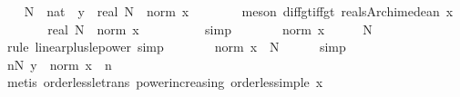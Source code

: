 \begin{isabellebody}
\ \ \isamarkupfalse%
\ N\ {\isacharcolon}{\kern0pt}{\isacharcolon}{\kern0pt}\ nat\ \ {\isachardoublequoteopen}y\ {\isacharless}{\kern0pt}\ real\ N\ {\isacharasterisk}{\kern0pt}\ {\isacharparenleft}{\kern0pt}norm\ x\ {\isacharminus}{\kern0pt}\ {}{\isacharparenright}{\kern0pt}{\isachardoublequoteclose}\isanewline
\ \ \ \ \isamarkupfalse%
\ {\isacharparenleft}{\kern0pt}meson\ diff{\isacharunderscore}{\kern0pt}gt{\isacharunderscore}{\kern0pt}{}{\isacharunderscore}{\kern0pt}iff{\isacharunderscore}{\kern0pt}gt\ reals{\isacharunderscore}{\kern0pt}Archimedean{}\ x{\isacharparenright}{\kern0pt}\isanewline
\ \ \isamarkupfalse%
\ \isamarkupfalse%
\ {\isachardoublequoteopen}{\isasymdots}\ {\isasymle}\ real\ N\ {\isacharasterisk}{\kern0pt}\ {\isacharparenleft}{\kern0pt}norm\ x\ {\isacharminus}{\kern0pt}\ {}{\isacharparenright}{\kern0pt}\ {\isacharplus}{\kern0pt}\ {}{\isachardoublequoteclose}\isanewline
\ \ \ \ \isamarkupfalse%
\ simp\isanewline
\ \ \isamarkupfalse%
\ \isamarkupfalse%
\ {\isachardoublequoteopen}{\isasymdots}\ {\isasymle}\ {\isacharparenleft}{\kern0pt}norm\ x\ {\isacharminus}{\kern0pt}\ {}\ {\isacharplus}{\kern0pt}\ {}{\isacharparenright}{\kern0pt}\ {\isacharcircum}{\kern0pt}\ N{\isachardoublequoteclose}\isanewline
\ \ \ \ \isamarkupfalse%
\ {\isacharparenleft}{\kern0pt}rule\ linear{\isacharunderscore}{\kern0pt}plus{\isacharunderscore}{\kern0pt}{}{\isacharunderscore}{\kern0pt}le{\isacharunderscore}{\kern0pt}power{\isacharparenright}{\kern0pt}\ simp\isanewline
\ \ \isamarkupfalse%
\ \isamarkupfalse%
\ {\isachardoublequoteopen}{\isasymdots}\ {\isacharequal}{\kern0pt}\ norm\ x\ {\isacharcircum}{\kern0pt}\ N{\isachardoublequoteclose}\isanewline
\ \ \ \ \isamarkupfalse%
\ simp\isanewline
\ \ \isamarkupfalse%
\ \isamarkupfalse%
\ {\isachardoublequoteopen}{\isasymforall}n{\isasymge}N{\isachardot}{\kern0pt}\ y\ {\isasymle}\ norm\ x\ {\isacharcircum}{\kern0pt}\ n{\isachardoublequoteclose}\isanewline
\ \ \ \ \isamarkupfalse%
\ {\isacharparenleft}{\kern0pt}metis\ order{\isacharunderscore}{\kern0pt}less{\isacharunderscore}{\kern0pt}le{\isacharunderscore}{\kern0pt}trans\ power{\isacharunderscore}{\kern0pt}increasing\ order{\isacharunderscore}{\kern0pt}less{\isacharunderscore}{\kern0pt}imp{\isacharunderscore}{\kern0pt}le\ x{\isacharparenright}{\kern0pt}\isanewline

\end{isabellebody}
